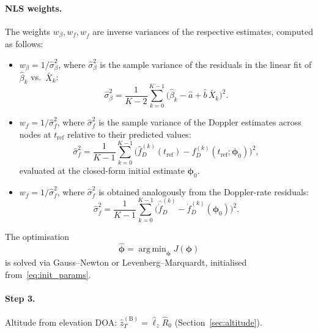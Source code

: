 \documentclass[11pt,a4paper]{article}
\DeclareMathOperator*{\argmin}{arg\,min}
\begin{document}
\paragraph{NLS weights.}
The weights $w_\beta,w_f,w_{\dot{f}}$ are inverse variances of the
respective estimates, computed as follows:
\begin{itemize}
  \item $w_\beta = 1/\hat{\sigma}_\beta^2$, where
    $\hat{\sigma}_\beta^2$ is the sample variance of the residuals
    in the linear fit of $\hat{\beta}_k$ vs.~$\bar{X}_k$:
    \begin{equation}
      \hat{\sigma}_\beta^2
      = \frac{1}{K{-}2}\sum_{k=0}^{K-1}
      \bigl(\hat{\beta}_k
      -\hat{a}+\hat{b}\,\bar{X}_k\bigr)^2.
      \label{eq:sigma_beta}
    \end{equation}
  \item $w_f = 1/\hat{\sigma}_f^2$, where $\hat{\sigma}_f^2$ is
    the sample variance of the Doppler estimates across nodes at
    $t_{\mathrm{ref}}$ relative to their predicted values:
    \begin{equation}
      \hat{\sigma}_f^2
      = \frac{1}{K{-}1}\sum_{k=0}^{K-1}
      \bigl(\hat{f}_D^{(k)}(t_{\mathrm{ref}})
      -f_D^{(k)}(t_{\mathrm{ref}};\bm{\phi}_0)\bigr)^2,
      \label{eq:sigma_f}
    \end{equation}
    evaluated at the closed-form initial estimate
    $\bm{\phi}_0$.
  \item $w_{\dot{f}} = 1/\hat{\sigma}_{\dot{f}}^2$, where
    $\hat{\sigma}_{\dot{f}}^2$ is obtained analogously from the
    Doppler-rate residuals:
    \begin{equation}
      \hat{\sigma}_{\dot{f}}^2
      = \frac{1}{K{-}1}\sum_{k=0}^{K-1}
      \bigl(\hat{\dot{f}}_D^{(k)}
      -\dot{f}_D^{(k)}(\bm{\phi}_0)\bigr)^2.
      \label{eq:sigma_fdot}
    \end{equation}
\end{itemize}
The optimisation
\begin{equation}
  \hat{\bm{\phi}} = \argmin_{\bm{\phi}} J(\bm{\phi})
  \label{eq:nls_solve}
\end{equation}
is solved via Gauss--Newton or Levenberg--Marquardt, initialised
from~\eqref{eq:init_params}.

\paragraph{Step 3.}
Altitude from elevation DOA:
$\hat{z}_T^{(\mathrm{B})}=\hat{\ell}_z\hat{R}_0$\;
(Section~\ref{sec:altitude}).
\end{document}
